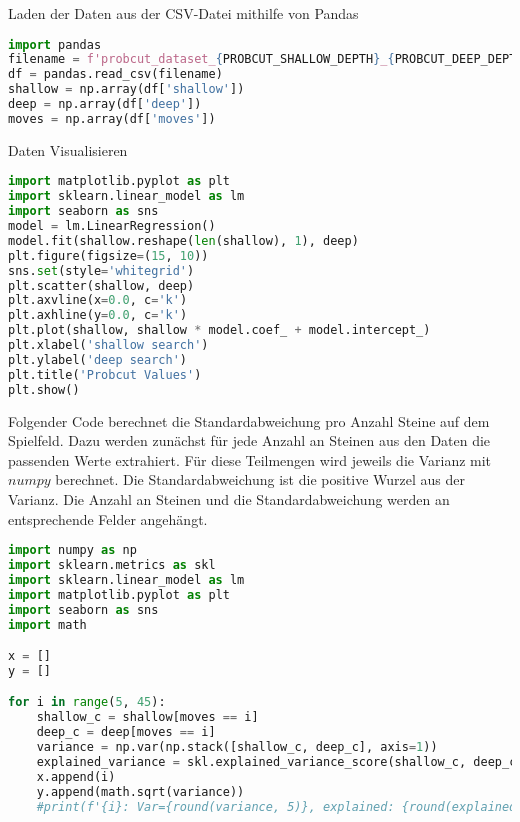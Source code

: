Laden der Daten aus der CSV-Datei mithilfe von Pandas

\begin{lstlisting}[language=Python]
import pandas
filename = f'probcut_dataset_{PROBCUT_SHALLOW_DEPTH}_{PROBCUT_DEEP_DEPTH}.csv'
df = pandas.read_csv(filename)
shallow = np.array(df['shallow'])
deep = np.array(df['deep'])
moves = np.array(df['moves'])
\end{lstlisting}

Daten Visualisieren

\begin{lstlisting}[language=Python]
import matplotlib.pyplot as plt
import sklearn.linear_model as lm
import seaborn as sns
model = lm.LinearRegression()
model.fit(shallow.reshape(len(shallow), 1), deep)
plt.figure(figsize=(15, 10))
sns.set(style='whitegrid')
plt.scatter(shallow, deep)
plt.axvline(x=0.0, c='k')
plt.axhline(y=0.0, c='k')
plt.plot(shallow, shallow * model.coef_ + model.intercept_)
plt.xlabel('shallow search')
plt.ylabel('deep search')
plt.title('Probcut Values')
plt.show()
\end{lstlisting}

Folgender Code berechnet die Standardabweichung pro Anzahl Steine auf
dem Spielfeld. Dazu werden zunächst für jede Anzahl an Steinen aus den
Daten die passenden Werte extrahiert. Für diese Teilmengen wird jeweils
die Varianz mit \(numpy\) berechnet. Die Standardabweichung ist die
positive Wurzel aus der Varianz. Die Anzahl an Steinen und die
Standardabweichung werden an entsprechende Felder angehängt.

\begin{lstlisting}[language=Python]
import numpy as np
import sklearn.metrics as skl
import sklearn.linear_model as lm
import matplotlib.pyplot as plt
import seaborn as sns
import math

x = []
y = []

for i in range(5, 45):
    shallow_c = shallow[moves == i]
    deep_c = deep[moves == i]
    variance = np.var(np.stack([shallow_c, deep_c], axis=1))
    explained_variance = skl.explained_variance_score(shallow_c, deep_c)
    x.append(i)
    y.append(math.sqrt(variance))
    #print(f'{i}: Var={round(variance, 5)}, explained: {round(explained_variance, 3)}')
\end{lstlisting}

